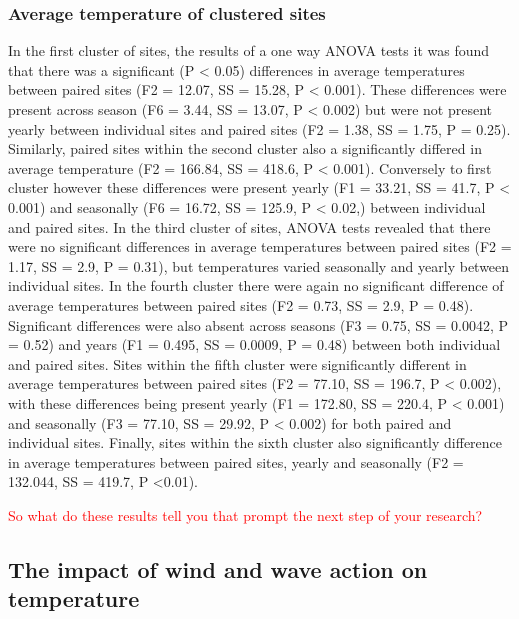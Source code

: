 \documentclass[12pt,A4paper,]{article}
\begin{document}
\subsubsection{Average temperature of clustered
sites}\label{average-temperature-of-clustered-sites}

In the first cluster of sites, the results of a one way ANOVA tests it
was found that there was a significant (P \textless{} 0.05) differences
in average temperatures between paired sites (F2 = 12.07, SS = 15.28, P
\textless{} 0.001). These differences were present across season (F6 =
3.44, SS = 13.07, P \textless{} 0.002) but were not present yearly
between individual sites and paired sites (F2 = 1.38, SS = 1.75, P =
0.25). Similarly, paired sites within the second cluster also a
significantly differed in average temperature (F2 = 166.84, SS = 418.6,
P \textless{} 0.001). Conversely to first cluster however these
differences were present yearly (F1 = 33.21, SS = 41.7, P \textless{}
0.001) and seasonally (F6 = 16.72, SS = 125.9, P \textless{} 0.02,)
between individual and paired sites. In the third cluster of sites,
ANOVA tests revealed that there were no significant differences in
average temperatures between paired sites (F2 = 1.17, SS = 2.9, P =
0.31), but temperatures varied seasonally and yearly between individual
sites. In the fourth cluster there were again no significant difference
of average temperatures between paired sites (F2 = 0.73, SS = 2.9, P =
0.48). Significant differences were also absent across seasons (F3 =
0.75, SS = 0.0042, P = 0.52) and years (F1 = 0.495, SS = 0.0009, P =
0.48) between both individual and paired sites. Sites within the fifth
cluster were significantly different in average temperatures between
paired sites (F2 = 77.10, SS = 196.7, P \textless{} 0.002), with these
differences being present yearly (F1 = 172.80, SS = 220.4, P \textless{}
0.001) and seasonally (F3 = 77.10, SS = 29.92, P \textless{} 0.002) for
both paired and individual sites. Finally, sites within the sixth
cluster also significantly difference in average temperatures between
paired sites, yearly and seasonally (F2 = 132.044, SS = 419.7, P
\textless{}0.01).

\textcolor{red}{So what do these results tell you that prompt the next step of your research?}

\subsection{The impact of wind and wave action on
temperature}\label{the-impact-of-wind-and-wave-action-on-temperature}
\end{document}
